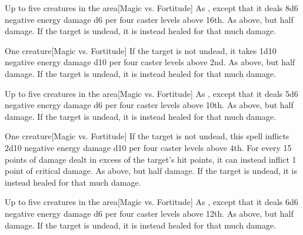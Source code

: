 \begin{spelltargets}{Up to five creatures in the area}[Magic vs. Fortitude]
    \spellsuccess As , except that it deals 8d6 negative energy damage \add d6 per four caster levels above 16th.
    \spellfailure As above, but half damage.
    \spelleffect If the target is undead, it is instead healed for that much damage.
\end{spelltargets}

\spellrng{\rngclose}
\begin{spelltarget}{One creature}[Magic vs. Fortitude]
    \spellsuccess If the target is not undead, it takes 1d10 negative energy damage \add d10 per four caster levels above 2nd.
    \spellfailure As above, but half damage.
    \spelleffect If the target is undead, it is instead healed for that much damage.
\end{spelltarget}

\begin{spelltargets}{Up to five creatures in the area}[Magic vs. Fortitude]
    \spellsuccess As , except that it deals 5d6 negative energy damage \add d6 per four caster levels above 10th.
    \spellfailure As above, but half damage.
    \spelleffect If the target is undead, it is instead healed for that much damage.
\end{spelltargets}

\spellrng{\rngclose}
\begin{spelltarget}{One creature}[Magic vs. Fortitude]
    \spellsuccess If the target is not undead, this spell inflicts 2d10 negative energy damage \add d10 per four caster levels above 4th. For every 15 points of damage dealt in excess of the target's hit points, it can instead inflict 1 point of critical damage.
    \spellfailure As above, but half damage.
    \spelleffect If the target is undead, it is instead healed for that much damage.
\end{spelltarget}

\begin{spelltargets}{Up to five creatures in the area}[Magic vs. Fortitude]
    \spellsuccess As , except that it deals 6d6 negative energy damage \add d6 per four caster levels above 12th.
    \spellfailure As above, but half damage.
    \spelleffect If the target is undead, it is instead healed for that much damage.
\end{spelltargets}

